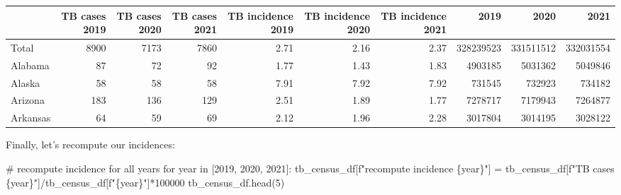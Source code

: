\documentclass[
  letterpaper,
  DIV=11,
  numbers=noendperiod]{scrreprt}
\newenvironment{Shaded}{\begin{snugshade}}{\end{snugshade}}
\newcommand{\CommentTok}[1]{\textcolor[rgb]{0.37,0.37,0.37}{#1}}
\newcommand{\ControlFlowTok}[1]{\textcolor[rgb]{0.00,0.23,0.31}{#1}}
\newcommand{\DecValTok}[1]{\textcolor[rgb]{0.68,0.00,0.00}{#1}}
\newcommand{\KeywordTok}[1]{\textcolor[rgb]{0.00,0.23,0.31}{#1}}
\newcommand{\NormalTok}[1]{\textcolor[rgb]{0.00,0.23,0.31}{#1}}
\newcommand{\OperatorTok}[1]{\textcolor[rgb]{0.37,0.37,0.37}{#1}}
\newcommand{\SpecialCharTok}[1]{\textcolor[rgb]{0.37,0.37,0.37}{#1}}
\newcommand{\SpecialStringTok}[1]{\textcolor[rgb]{0.13,0.47,0.30}{#1}}
\begin{document}
\begin{tabular}{lrrrrrrrrr}
\toprule
{} &  TB cases 2019 &  TB cases 2020 &  TB cases 2021 &  TB incidence 2019 &  TB incidence 2020 &  TB incidence 2021 &       2019 &       2020 &       2021 \\
\midrule
Total    &           8900 &           7173 &           7860 &               2.71 &               2.16 &               2.37 &  328239523 &  331511512 &  332031554 \\
Alabama  &             87 &             72 &             92 &               1.77 &               1.43 &               1.83 &    4903185 &    5031362 &    5049846 \\
Alaska   &             58 &             58 &             58 &               7.91 &               7.92 &               7.92 &     731545 &     732923 &     734182 \\
Arizona  &            183 &            136 &            129 &               2.51 &               1.89 &               1.77 &    7278717 &    7179943 &    7264877 \\
Arkansas &             64 &             59 &             69 &               2.12 &               1.96 &               2.28 &    3017804 &    3014195 &    3028122 \\
\bottomrule
\end{tabular}

Finally, let's recompute our incidences:

\begin{Shaded}
\begin{Highlighting}[]
\CommentTok{\# recompute incidence for all years}
\ControlFlowTok{for}\NormalTok{ year }\KeywordTok{in}\NormalTok{ [}\DecValTok{2019}\NormalTok{, }\DecValTok{2020}\NormalTok{, }\DecValTok{2021}\NormalTok{]:}
\NormalTok{    tb\_census\_df[}\SpecialStringTok{f"recompute incidence }\SpecialCharTok{\{}\NormalTok{year}\SpecialCharTok{\}}\SpecialStringTok{"}\NormalTok{] }\OperatorTok{=}\NormalTok{ tb\_census\_df[}\SpecialStringTok{f"TB cases }\SpecialCharTok{\{}\NormalTok{year}\SpecialCharTok{\}}\SpecialStringTok{"}\NormalTok{]}\OperatorTok{/}\NormalTok{tb\_census\_df[}\SpecialStringTok{f"}\SpecialCharTok{\{}\NormalTok{year}\SpecialCharTok{\}}\SpecialStringTok{"}\NormalTok{]}\OperatorTok{*}\DecValTok{100000}
\NormalTok{tb\_census\_df.head(}\DecValTok{5}\NormalTok{)}
\end{Highlighting}
\end{Shaded}
\end{document}

